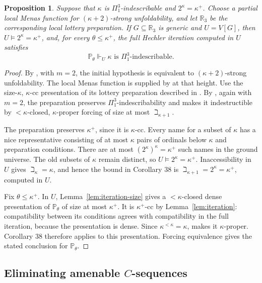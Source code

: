 \documentclass[10pt,a4paper]{amsart}
\newtheorem{proposition}[theorem]{Proposition}
\theoremstyle{definition}
\theoremstyle{remark}
\newcommand{\PP}{\mathbb P}
\newcommand{\RR}{\mathbb R}
\begin{document}
\begin{proposition}
\label{prop:pi3-preparation}
Suppose that \(\kappa\) is \(\Pi^3_1\)-indescribable and
\(2^\kappa=\kappa^+\). Choose a partial local Menas function
for \((\kappa+2)\)-strong unfoldability, and let
\(\RR_3\) be the corresponding local lottery preparation.
If \(G\subseteq\RR_3\) is generic and \(U=V[G]\), then
\(U\models2^\kappa=\kappa^+\), and, for every
\(\theta\leq\kappa^+\), the full Hechler iteration
computed in \(U\) satisfies
\[
 \PP_\theta\Vdash_U
       \text{\(\kappa\) is \(\Pi^3_1\)-indescribable}.
\]
\end{proposition}
\begin{proof}
By \cite[Corollary 35]{Johnstone}, with \(m=2\), the
initial hypothesis is equivalent to
\((\kappa+2)\)-strong unfoldability. The local Menas
function is supplied by \cite[Theorem 10(2)]{Johnstone}
at that height. Use the size-\(\kappa\), \(\kappa\)-cc
presentation of its lottery preparation described in
\cite[pp.~1229--1230]{Johnstone}.
By \cite[Corollary 38]{Johnstone}, again with \(m=2\), the preparation
preserves \(\Pi^3_1\)-indescribability and makes it
indestructible by \(<\kappa\)-closed,
\(\kappa\)-proper forcing of size at most
\(\beth_{\kappa+1}\).

The preparation preserves \(\kappa^+\), since it is
\(\kappa\)-cc. Every name for a subset of \(\kappa\)
has a nice representative consisting of at most
\(\kappa\) pairs of ordinals below \(\kappa\) and
preparation conditions. There are at most
\((2^\kappa)^\kappa=\kappa^+\) such names in the
ground universe. The old subsets of \(\kappa\) remain
distinct, so \(U\models2^\kappa=\kappa^+\).
Inaccessibility in \(U\) gives \(\beth_\kappa=\kappa\),
and hence the bound in Corollary 38 is
\(\beth_{\kappa+1}=2^\kappa=\kappa^+\), computed in
\(U\).

Fix \(\theta\leq\kappa^+\). In \(U\),
Lemma~\ref{lem:iteration-size} gives a
\(<\kappa\)-closed dense presentation of
\(\PP_\theta\) of size at most \(\kappa^+\).
It is \(\kappa^+\)-cc by Lemma~\ref{lem:iteration}:
compatibility between its conditions agrees with
compatibility in the full iteration, because the
presentation is dense. Since
\(\kappa^{<\kappa}=\kappa\),
\cite[Fact 13(4)]{Johnstone} makes it
\(\kappa\)-proper. Corollary 38 therefore applies
to this presentation. Forcing equivalence gives the
stated conclusion for \(\PP_\theta\).
\end{proof}

\subsection{Eliminating amenable \texorpdfstring{\(C\)}{C}-sequences}
\end{document}
